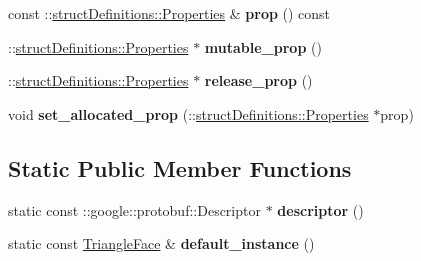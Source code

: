\begin{DoxyCompactItemize}
const \+::\hyperlink{classstruct_definitions_1_1_properties}{struct\+Definitions\+::\+Properties} \& {\bfseries prop} () const
\item 
\hypertarget{classstruct_definitions_1_1_triangle_face_a262e3774d364b76908d9b7cfe26390ad}{}\label{classstruct_definitions_1_1_triangle_face_a262e3774d364b76908d9b7cfe26390ad} 
\+::\hyperlink{classstruct_definitions_1_1_properties}{struct\+Definitions\+::\+Properties} $\ast$ {\bfseries mutable\+\_\+prop} ()
\item 
\hypertarget{classstruct_definitions_1_1_triangle_face_a831e964881dbd21496a260a5d7a7dc0b}{}\label{classstruct_definitions_1_1_triangle_face_a831e964881dbd21496a260a5d7a7dc0b} 
\+::\hyperlink{classstruct_definitions_1_1_properties}{struct\+Definitions\+::\+Properties} $\ast$ {\bfseries release\+\_\+prop} ()
\item 
\hypertarget{classstruct_definitions_1_1_triangle_face_ad8612b3ce645635129a328f50aa8071d}{}\label{classstruct_definitions_1_1_triangle_face_ad8612b3ce645635129a328f50aa8071d} 
void {\bfseries set\+\_\+allocated\+\_\+prop} (\+::\hyperlink{classstruct_definitions_1_1_properties}{struct\+Definitions\+::\+Properties} $\ast$prop)
\end{DoxyCompactItemize}
\subsection*{Static Public Member Functions}
\begin{DoxyCompactItemize}
\item 
\hypertarget{classstruct_definitions_1_1_triangle_face_a682453fbd193cacc45194a8d440aa423}{}\label{classstruct_definitions_1_1_triangle_face_a682453fbd193cacc45194a8d440aa423} 
static const \+::google\+::protobuf\+::\+Descriptor $\ast$ {\bfseries descriptor} ()
\item 
\hypertarget{classstruct_definitions_1_1_triangle_face_a55e377bea665436335cd047a2c744e4a}{}\label{classstruct_definitions_1_1_triangle_face_a55e377bea665436335cd047a2c744e4a} 
static const \hyperlink{classstruct_definitions_1_1_triangle_face}{Triangle\+Face} \& {\bfseries default\+\_\+instance} ()
\end{DoxyCompactItemize}
